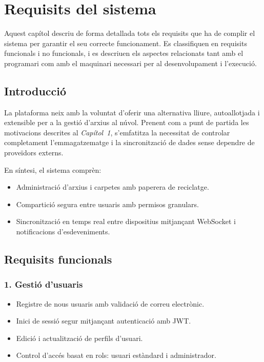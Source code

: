 \chapter{Requisits del sistema}

Aquest capítol descriu de forma detallada tots els requisits que ha de complir el sistema per garantir el seu correcte funcionament. Es classifiquen en requisits funcionals i no funcionals, i es descriuen els aspectes relacionats tant amb el programari com amb el maquinari necessari per al desenvolupament i l'execució.

\section{Introducció}
La plataforma neix amb la voluntat d'oferir una alternativa lliure, autoallotjada i extensible per a la gestió d'arxius al núvol. Prenent com a punt de partida les motivacions descrites al \textit{Capítol~1}, s'emfatitza la necessitat de controlar completament l'emmagatzematge i la sincronització de dades sense dependre de proveïdors externs.\par
En síntesi, el sistema comprèn:
\begin{itemize}
  \item Administració d'arxius i carpetes amb paperera de reciclatge.
  \item Compartició segura entre usuaris amb permisos granulars.
  \item Sincronització en temps real entre dispositius mitjançant WebSocket i notificacions d'esdeveniments.
\end{itemize}

\section{Requisits funcionals}

\subsection{1. Gestió d'usuaris}
\begin{itemize}
  \item Registre de nous usuaris amb validació de correu electrònic.
  \item Inici de sessió segur mitjançant autenticació amb JWT.
  \item Edició i actualització de perfils d'usuari.
  \item Control d'accés basat en rols: usuari estàndard i administrador.
\end{itemize}

